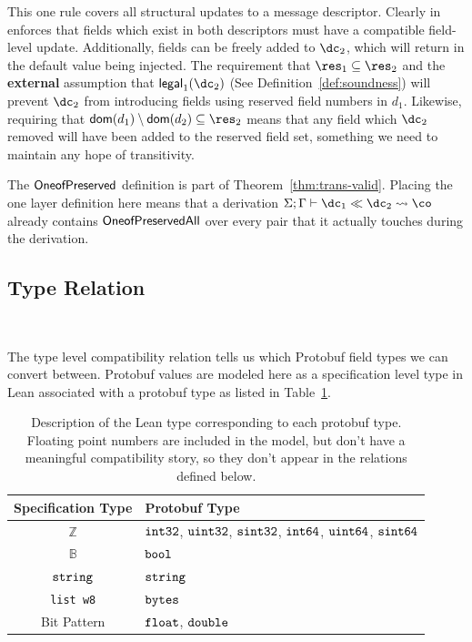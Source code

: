 This one rule covers all structural updates to a message descriptor. Clearly in
enforces that fields which exist in both descriptors must have a compatible
field-level update. Additionally, fields can be freely added to $\dc_2$, which
will return in the default value being injected. The requirement that
$\res_1 \subseteq \res_2$ and the \textbf{external} assumption that
$\legald{\dc_2}$ (See Definition~\ref{def:soundness}) will prevent $\dc_2$ from
introducing fields using reserved field numbers in $d_1$. Likewise, requiring
that $\dom{d_1} \setminus \dom{d_2} \subseteq \res_2$ means that any field which
$\dc_2$ removed will have been added to the reserved field set, something we
need to maintain any hope of transitivity.

The $\mathsf{OneofPreserved}$ definition is part of Theorem~\ref{thm:trans-valid}. Placing
the one layer definition here means that a derivation
$\judg{\Gamma}{\dc_1 \dcompat \dc_2 \coerce \co}$ already contains
$\mathsf{OneofPreservedAll}$ over every pair that it actually touches during the derivation.

\subsection{Type Relation}~\label{sec:typ-rel}

The type level compatibility relation tells us which Protobuf field types we
can convert between. Protobuf values are modeled here as a specification level
type in Lean associated with a protobuf type as listed in
Table~\ref{tab:val-spec}. 

\begin{table}[H]
	\centering
	\begin{tabular}{cl}
      \toprule
      Specification Type & Protobuf Type \\
      \midrule
      $\mathbb{Z}$ & $\texttt{int32}$, $\texttt{uint32}$, $\texttt{sint32}$,
            $\texttt{int64}$, $\texttt{uint64}$, $\texttt{sint64}$ \\
      $\mathbb{B}$ & $\texttt{bool}$    \\
      $\texttt{string}$ & $\texttt{string}$    \\
      \texttt{list w8}  & $\texttt{bytes}$    \\
      Bit Pattern & $\texttt{float}$, $\texttt{double}$ \\
      \bottomrule
	\end{tabular}

	\vspace{4mm}
	\caption[]{Description of the Lean type corresponding to each protobuf
      type. Floating point numbers are included in the model, but don't have a
      meaningful compatibility story, so they don't appear in the relations
      defined below.}\label{tab:val-spec}
\end{table}

